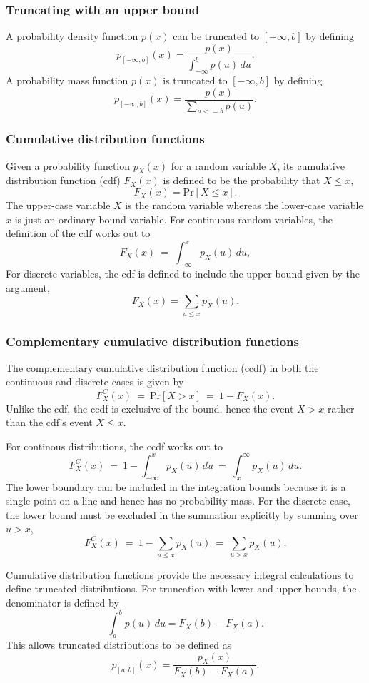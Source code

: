 \subsubsection{Truncating with an upper bound}

A probability density function $p(x)$ can be truncated to $[-\infty, b]$ by
defining
%
\[
p_{[-\infty, b]}(x)
= \frac{p(x)}
       {\int_{-\infty}^b p(u) \, du}.
\]
%
A probability mass function $p(x)$ is truncated to $[-\infty, b]$ by
defining 
%
\[
p_{[-\infty,b]}(x) = \frac{p(x)}
                  {\sum_{u <= b} p(u)}.
\]


\subsubsection{Cumulative distribution functions}

Given a probability function $p_X(x)$ for a random variable $X$, its
cumulative distribution function (cdf) $F_X(x)$ is defined to be the
probability that $X \leq x$,
%
\[
F_X(x) = \mbox{Pr}[X \leq x].
\]
The upper-case variable $X$ is the random variable whereas the
lower-case variable $x$ is just an ordinary bound variable.  For
continuous random variables, the definition of the cdf works out to
\[
F_X(x) \ = \ \int_{-\infty}^{x} p_X(u) \, du,
\]
For discrete variables, the cdf is defined to include the upper bound
given by the argument,
\[
F_X(x) = \sum_{u \leq x} p_X(u).
\]
%

\subsubsection{Complementary cumulative distribution functions}

The complementary cumulative distribution function (ccdf) in both the
continuous and discrete cases is given by
\[
F^C_X(x)
\ = \ \mbox{Pr}[X > x]
\ = \ 1 - F_X(x).
\]
Unlike the cdf, the ccdf is exclusive of the bound, hence the event
$X > x$ rather than the cdf's event $X \leq x$.

For continous distributions, the ccdf works out to 
\[
F^C_X(x)
\ = \ 1 - \int_{-\infty}^x p_X(u) \, du
\ = \ \int_x^{\infty} p_X(u) \, du.
\]
The lower boundary can be included in the integration bounds because
it is a single point on a line and hence has no probability mass.
For the discrete case, the lower bound must be excluded in the
summation explicitly by summing over $u > x$,
\[
F^C_X(x)
\ = \ 1 - \sum_{u \leq x} p_X(u)
\ = \ \sum_{u > x} p_X(u).
\]


Cumulative distribution functions provide the necessary integral
calculations to define truncated distributions.  For truncation with
lower and upper bounds, the denominator is defined by
\[
\int_a^b p(u) \, du = F_X(b) - F_X(a).
\]
This allows truncated distributions to be defined as
\[
p_{[a,b]}(x) = \frac{p_X(x)}
                  {F_X(b) - F_X(a)}.
\]

